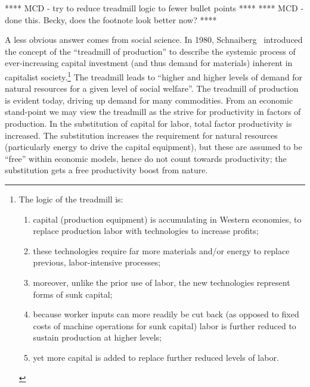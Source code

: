 **** MCD - try to reduce treadmill logic to fewer bullet points ****
**** MCD - done this. Becky, does the footnote look better now? ****

A less obvious answer comes from social science.
In 1980, Schnaiberg~\cite{schnaiberg1980} introduced the concept of 
the ``treadmill of production'' to describe the systemic process of
ever-increasing capital investment (and thus demand for materials)
inherent in capitalist society.\footnote{
	The logic of the treadmill is:
 		\begin{enumerate}[noitemsep,topsep=0pt]
 			\item 	capital (production equipment)
 						is accumulating in Western economies, 
 						to replace production labor 
 						with technologies to increase profits; 
 			\item 	these technologies require far more materials and/or energy 
 						to replace previous, labor-intensive processes;
 			\item 	moreover, unlike the prior use of labor, 
 						the new technologies represent forms of sunk capital;
 			\item 	because worker inputs can more readily be cut back 
 						(as opposed to fixed costs of machine operations for sunk capital)
 						labor is further reduced to sustain production at higher levels;
 			\item	yet more capital is added to replace further reduced levels
 						of labor.~\cite[p.296]{Gould2004}
		 \end{enumerate}
 }
The treadmill leads to ``higher and higher levels of demand for natural resources 
for a given level of social welfare''.\cite[p.297]{Gould2004}
The treadmill of production is evident today, 
driving up demand for many commodities.
From an economic stand-point we may view the treadmill
as the strive for productivity in factors of production.
In the substitution of capital for labor,
total factor productivity is increased.
The substitution increases the requirement for natural resources
(particularly energy to drive the capital equipment),
but these are assumed to be ``free'' within economic models,
hence do not count towards productivity;
the substitution gets a free productivity boost from nature.

